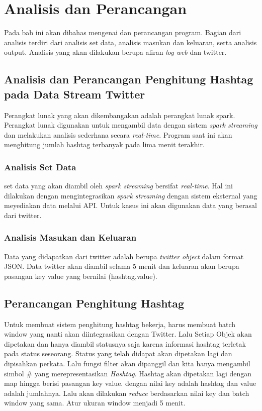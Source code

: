 \chapter{Analisis dan Perancangan}
\label{Analisis dan Perancangan}

Pada bab ini akan dibahas mengenai dan perancangan program. Bagian dari analisis terdiri dari
analisis set data, analisis masukan dan keluaran, serta analisis output. Analisis yang akan dilakukan berupa aliran \textit{log web} dan twitter.

\section{Analisis dan Perancangan Penghitung Hashtag pada Data Stream Twitter}
Perangkat lunak yang akan dikembangakan adalah perangkat lunak spark. Perangkat lunak digunakan untuk mengambil data dengan sistem \textit{spark streaming} dan melakukan analisis sederhana secara \textit{real-time}. Program saat ini akan menghitung jumlah hashtag terbanyak pada lima menit terakhir.

\subsection{Analisis Set Data}
set data yang akan diambil oleh \textit{spark streaming} bersifat \textit{real-time}. Hal ini dilakukan dengan mengintegrasikan \textit{spark streaming} dengan sistem eksternal yang meyediakan data melalui API. Untuk kasus ini akan digunakan data yang berasal dari twitter.
 
\subsection{Analisis Masukan dan Keluaran}
Data yang didapatkan dari twitter adalah berupa \textit{twitter object} dalam format JSON. Data twitter akan diambil selama 5 menit dan keluaran akan berupa pasangan key value yang bernilai (hashtag,value).

\section{Perancangan Penghitung Hashtag}

Untuk membuat sistem penghitung hashtag bekerja, harus membuat batch window yang nanti akan diintegrasikan dengan Twitter. Lalu Setiap Objek akan dipetakan dan hanya diambil statusnya saja karena informasi hashtag terletak pada status seseorang. Status yang telah didapat akan dipetakan lagi dan dipisahkan perkata. Lalu fungsi filter akan dipanggil dan kita hanya mengambil simbol \# yang merepresentasikan \textit{Hashtag}. Hashtag akan dipetakan lagi dengan map hingga berisi pasangan key value. dengan nilai key adalah hashtag dan value adalah jumlahnya. Lalu akan dilakukan \textit{reduce} berdasarkan nilai key dan batch window yang sama. Atur ukuran window menjadi 5 menit.

